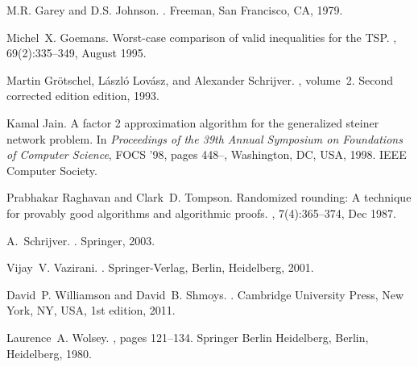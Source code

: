 \documentclass[runningheads]{llncs}
\begin{document}
\begin{thebibliography}{10}
	M.R. Garey and D.S. Johnson.
	.
	\newblock Freeman, San Francisco, CA, 1979.
	
	Michel~X. Goemans.
	\newblock Worst-case comparison of valid inequalities for the {TSP}.
	, 69(2):335--349, August 1995.
	
	Martin Gr{\"o}tschel, L{\'a}szl{\'o} Lov{\'a}sz, and Alexander Schrijver.
	, volume~2.
	\newblock Second corrected edition edition, 1993.
	
	Kamal Jain.
	\newblock A factor 2 approximation algorithm for the generalized steiner
	network problem.
	\newblock In {\em Proceedings of the 39th Annual Symposium on Foundations of
		Computer Science}, FOCS '98, pages 448--, Washington, DC, USA, 1998. IEEE
	Computer Society.
	
	Prabhakar Raghavan and Clark~D. Tompson.
	\newblock Randomized rounding: A technique for provably good algorithms and
	algorithmic proofs.
	, 7(4):365--374, Dec 1987.
	
	A.~Schrijver.
	.
	\newblock Springer, 2003.
	
	Vijay~V. Vazirani.
	.
	\newblock Springer-Verlag, Berlin, Heidelberg, 2001.
	
	David~P. Williamson and David~B. Shmoys.
	.
	\newblock Cambridge University Press, New York, NY, USA, 1st edition, 2011.
	
	Laurence~A. Wolsey.
	,
	pages 121--134.
	\newblock Springer Berlin Heidelberg, Berlin, Heidelberg, 1980.
	
\end{thebibliography}
\newpage
\appendix


\end{document}
